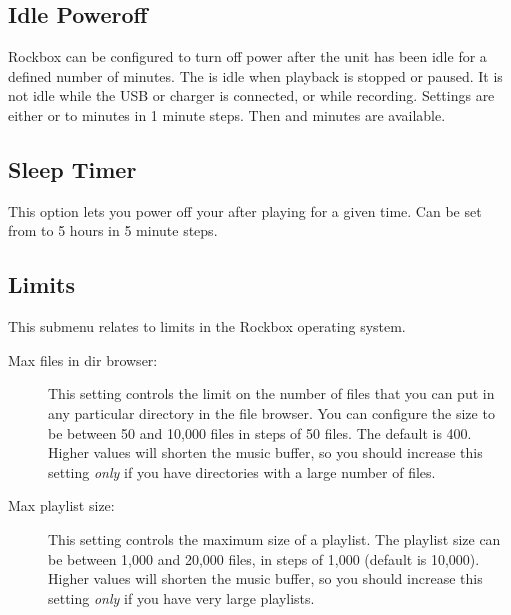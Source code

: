 \subsection{Idle Poweroff}
Rockbox can be configured to turn off power after the unit has been idle for a 
defined number of minutes. The \dap{} is idle when playback is stopped or 
paused. It is not idle while the USB or charger is connected, or while 
recording. Settings are either  or  to 
minutes in 1 minute steps. Then  and  minutes are
available.
\subsection{Sleep Timer}
This option lets you power off your \dap{} after playing for a given time. Can
be set from  to 5 hours in 5 minute steps.

\subsection{Limits}
This submenu relates to limits in the Rockbox operating system.
  \begin{description}
    \item [Max files in dir browser: ]This setting controls the limit on
    the number of files that you can put in any particular directory in the
    file browser. You can configure the size to be between 50 and 10,000 files
    in steps of 50 files. The default is 400. Higher values will shorten the
    music buffer, so you should increase this setting \emph{only} if you have
    directories with a large number of files.

    \item [Max playlist size: ]This setting controls the maximum size of 
    a playlist. The playlist size can be between 1,000 and 20,000 files,
    in steps of 1,000 (default is 10,000). Higher values will shorten the
    music buffer, so you should increase this setting \emph{only} if you
    have very large playlists.
  \end{description}

